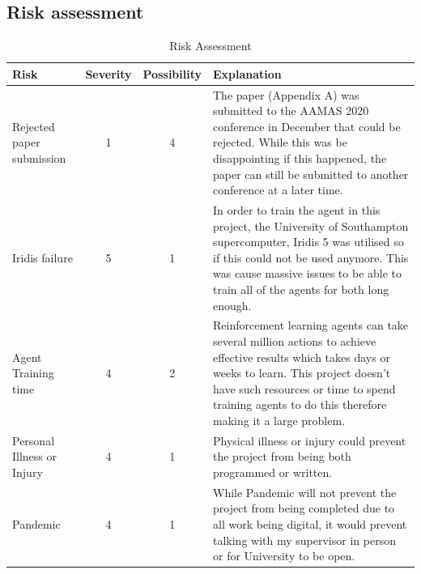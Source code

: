 \subsection*{Risk assessment}
\begin{table}[H]
    \centering
    \begin{tabular}{|p{3cm}|c|c|p{7cm}|} \hline
        \textbf{Risk}  & \textbf{Severity} & \textbf{Possibility} & \textbf{Explanation} \\ \hline
        Rejected paper submission & 1 & 4 & The paper (Appendix A) was submitted to the AAMAS 2020 conference in
            December that could be rejected. While this was be disappointing if this happened, the paper can still be
            submitted to another conference at a later time. \\ \hline
        Iridis failure & 5 & 1 & In order to train the agent in this project, the University of Southampton supercomputer,
            Iridis 5 was utilised so if this could not be used anymore. This was cause massive issues to be able to
            train all of the agents for both long enough. \\ \hline
        Agent Training time & 4 & 2 & Reinforcement learning agents can take several million actions to achieve
            effective results which takes days or weeks to learn. This project doesn't have such resources or time to
            spend training agents to do this therefore making it a large problem. \\ \hline
        Personal Illness or Injury & 4 & 1 & Physical illness or injury could prevent the project from being both
            programmed or written. \\ \hline
        Pandemic & 4 & 1 & While Pandemic will not prevent the project from being completed due to all work being
            digital, it would prevent talking with my supervisor in person or for University to be open. \\ \hline
    \end{tabular}
    \caption{Risk Assessment}
    \label{tab:risk_assessment}
\end{table}


